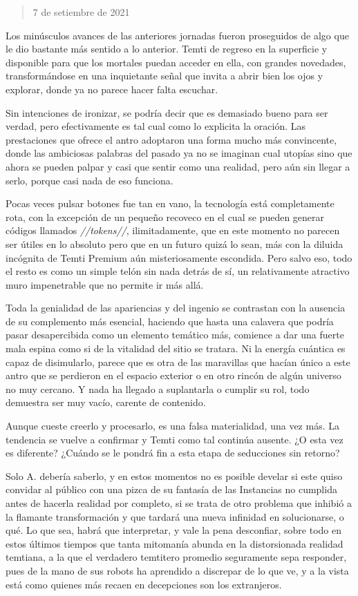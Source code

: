 \documentclass[
  spanish,
]{book}
\begin{document}
\begin{quote}
7 de setiembre de 2021
\end{quote}

Los minúsculos avances de las anteriores jornadas fueron proseguidos de algo que le dio bastante más sentido a lo anterior. Temti de regreso en la superficie y disponible para que los mortales puedan acceder en ella, con grandes novedades, transformándose en una inquietante señal que invita a abrir bien los ojos y explorar, donde ya no parece hacer falta escuchar.

Sin intenciones de ironizar, se podría decir que es demasiado bueno para ser verdad, pero efectivamente es tal cual como lo explicita la oración. Las prestaciones que ofrece el antro adoptaron una forma mucho más convincente, donde las ambiciosas palabras del pasado ya no se imaginan cual utopías sino que ahora se pueden palpar y casi que sentir como una realidad, pero aún sin llegar a serlo, porque casi nada de eso funciona.

Pocas veces pulsar botones fue tan en vano, la tecnología está completamente rota, con la excepción de un pequeño recoveco en el cual se pueden generar códigos llamados \emph{//tokens//}, ilimitadamente, que en este momento no parecen ser útiles en lo absoluto pero que en un futuro quizá lo sean, más con la diluida incógnita de Temti Premium aún misteriosamente escondida. Pero salvo eso, todo el resto es como un simple telón sin nada detrás de sí, un relativamente atractivo muro impenetrable que no permite ir más allá.

Toda la genialidad de las apariencias y del ingenio se contrastan con la ausencia de su complemento más esencial, haciendo que hasta una calavera que podría pasar desapercibida como un elemento temático más, comience a dar una fuerte mala espina como si de la vitalidad del sitio se tratara. Ni la energía cuántica es capaz de disimularlo, parece que es otra de las maravillas que hacían único a este antro que se perdieron en el espacio exterior o en otro rincón de algún universo no muy cercano. Y nada ha llegado a suplantarla o cumplir su rol, todo demuestra ser muy vacío, carente de contenido.

Aunque cueste creerlo y procesarlo, es una falsa materialidad, una vez más. La tendencia se vuelve a confirmar y Temti como tal continúa ausente. ¿O esta vez es diferente? ¿Cuándo se le pondrá fin a esta etapa de seducciones sin retorno?

Solo A. debería saberlo, y en estos momentos no es posible develar si este quiso convidar al público con una pizca de su fantasía de las Instancias no cumplida antes de hacerla realidad por completo, si se trata de otro problema que inhibió a la flamante transformación y que tardará una nueva infinidad en solucionarse, o qué. Lo que sea, habrá que interpretar, y vale la pena desconfiar, sobre todo en estos últimos tiempos que tanta mitomanía abunda en la distorsionada realidad temtiana, a la que el verdadero temtitero promedio seguramente sepa responder, pues de la mano de sus robots ha aprendido a discrepar de lo que ve, y a la vista está como quienes más recaen en decepciones son los extranjeros.
\end{document}
